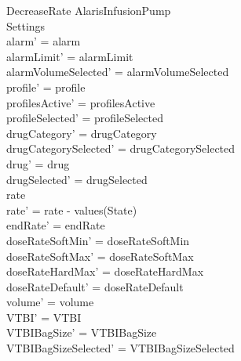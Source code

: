 \begin{schema}{DecreaseRate}
	\Delta AlarisInfusionPump\\
	 
	Settings\\
	\where
	alarm' = alarm\\
	alarmLimit' = alarmLimit\\
	alarmVolumeSelected' = alarmVolumeSelected\\
	profile' = profile\\
	profilesActive' = profilesActive\\  
	  profileSelected' = profileSelected\\
	drugCategory' = drugCategory\\ drugCategorySelected' = drugCategorySelected\\
	drug' = drug\\ drugSelected' = drugSelected\\
	rate \\
	rate' = rate - values(State)\\
	endRate' = endRate\\
	doseRateSoftMin' = doseRateSoftMin\\
	\pagebreak
	doseRateSoftMax' = doseRateSoftMax\\
	doseRateHardMax' = doseRateHardMax\\
	doseRateDefault' = doseRateDefault\\
	volume' = volume\\
	VTBI' = VTBI\\
	VTBIBagSize' = VTBIBagSize\\ VTBIBagSizeSelected' = VTBIBagSizeSelected\\

\end{schema}
